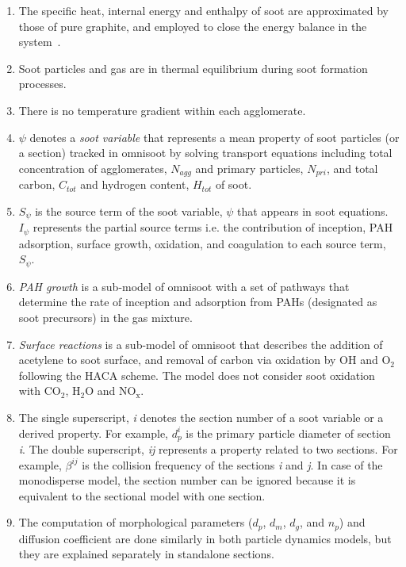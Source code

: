 \begin{enumerate}
\item The specific heat, internal energy and enthalpy of soot are approximated by those of pure graphite, and employed to close the energy balance in the system~\cite{mcbride1993coefficients}.

\item Soot particles and gas are in thermal equilibrium during soot formation processes.

\item There is no temperature gradient within each agglomerate.

\item $\psi$ denotes a \textit{soot variable} that represents a mean property of soot particles (or a section) tracked in omnisoot by solving transport equations including total concentration of agglomerates, $N_{agg}$ and primary particles, $N_{pri}$, and total carbon, $C_{tot}$ and hydrogen content, $H_{tot}$ of soot.

\item $S_{\psi}$ is the source term of the soot variable, $\psi$ that appears in soot equations. $I_{\psi}$ represents the partial source terms i.e. the contribution of inception, PAH adsorption, surface growth, oxidation, and coagulation to each source term, $S_{\psi}$.  

\item \textit{PAH growth} is a sub-model of omnisoot with a set of pathways that determine the rate of inception and adsorption from PAHs (designated as soot precursors) in the gas mixture.

\item \textit{Surface reactions} is a sub-model of omnisoot that describes the addition of acetylene to soot surface, and removal of carbon via oxidation by OH and $\mathrm{O_2}$ following the HACA scheme. The model does not consider soot oxidation with $\mathrm{CO_2}$, $\mathrm{H_2O}$ and $\mathrm{NO_x}$.

\item The single superscript, \textit{i} denotes the section number of a soot variable or a derived property. For example, $d^i_p$ is the primary particle diameter of section \textit{i}. The double superscript, \textit{ij} represents a property related to two sections. For example, $\beta^{ij}$ is the collision frequency of the sections \textit{i} and \textit{j}.  In case of the monodisperse model, the section number can be ignored because it is equivalent to the sectional model with one section.

\item The computation of morphological parameters ($d_p$, $d_m$, $d_g$, and $n_p$) and diffusion coefficient are done similarly in both particle dynamics models, but they are explained separately in standalone sections.


\end{enumerate}
